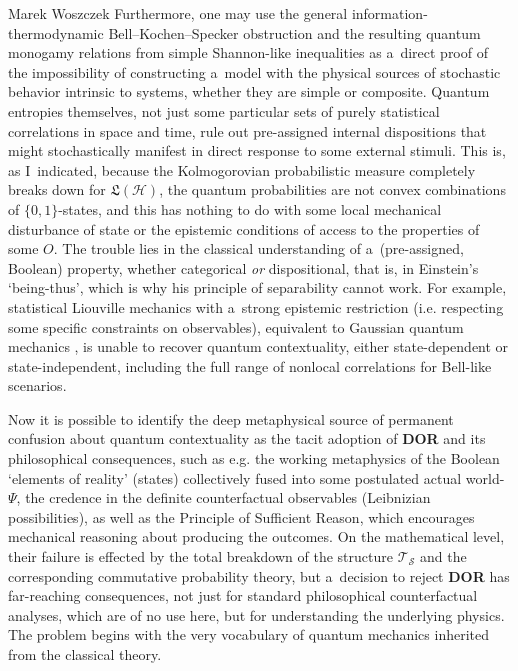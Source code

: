 \begin{artengenv}{Marek Woszczek}
Furthermore, one may use the general information-thermodynamic Bell–Kochen–Specker obstruction and the resulting quantum monogamy relations from simple Shannon-like inequalities
\parencite[][]{jia_entropic_2018} %
 as a~direct proof of the impossibility of constructing a~model with the physical sources of stochastic behavior intrinsic to systems, whether they are simple or composite. Quantum entropies themselves, not just some particular sets of purely statistical correlations in space and time, rule out pre-assigned internal dispositions that might stochastically manifest in direct response to some external stimuli. This is, as I~indicated, because the Kolmogorovian probabilistic measure completely breaks down for $\bm{\mathfrak{L}}(\mathcal{H})$, the quantum probabilities are not convex combinations of $\{0,1\}$-states, and this has nothing to do with some local mechanical disturbance of state or the epistemic conditions of access to the properties of some $O$. The trouble lies in the classical understanding of a~(pre-assigned, Boolean) property, whether categorical \textit{or} dispositional, that is, in Einstein's ‘being-thus', which is why his principle of separability cannot work. For example, statistical Liouville mechanics with a~strong epistemic restriction (i.e. respecting some specific constraints on observables), equivalent to Gaussian quantum mechanics 
\parencite[][]{bartlett_reconstruction_2012}, %
 is unable to recover quantum contextuality, either state-dependent or state-independent, including the full range of nonlocal correlations for Bell-like scenarios.

Now it is possible to identify the deep metaphysical source of permanent confusion about quantum contextuality as the tacit adoption of \textbf{DOR} and its philosophical consequences, such as e.g. the working metaphysics of the Boolean ‘elements of reality' (states) collectively fused into some postulated actual world-$\Psi$, the credence in the definite counterfactual observables (Leibnizian possibilities), as well as the Principle of Sufficient Reason, which encourages mechanical reasoning about producing the outcomes. On the mathematical level, their failure is effected by the total breakdown of the structure $\bm{\mathcal{T}}_{\mathcal{S}}$ and the corresponding commutative probability theory, but a~decision to reject \textbf{DOR} has far-reaching consequences, not just for standard philosophical counterfactual analyses, which are of no use here, but for understanding the underlying physics. The problem begins with the very vocabulary of quantum mechanics inherited from the classical theory.


\end{artengenv}
